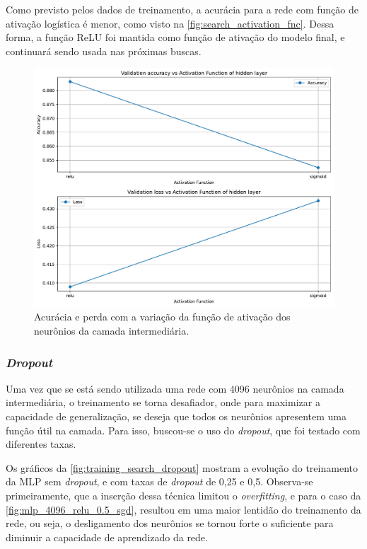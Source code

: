 Como previsto pelos dados de treinamento, a acurácia para a rede com função de ativação logística é menor, como visto na \autoref{fig:search_activation_fnc}. Dessa forma, a função ReLU foi mantida como função de ativação do modelo final, e continuará sendo usada nas próximas buscas.

\begin{figure}[H]
\centering
\includegraphics[width=0.75\linewidth]{../../plot/mlp/search_activation_fnc}
\caption{Acurácia e perda com a variação da função de ativação dos neurônios da camada intermediária.}
\label{fig:search_activation_fnc}
\end{figure}

\subsubsection{\textit{Dropout}}

	Uma vez que se está sendo utilizada uma rede com 4096 neurônios na camada intermediária, o treinamento se torna desafiador, onde para maximizar a capacidade de generalização, se deseja que todos os neurônios apresentem uma função útil na camada. Para isso, buscou-se o uso do \textit{dropout}, que foi testado com diferentes taxas.
	
	Os gráficos da \autoref{fig:training_search_dropout} mostram a evolução do treinamento da MLP sem \textit{dropout}, e com taxas de \textit{dropout} de 0,25 e 0,5. Observa-se primeiramente, que a inserção dessa técnica limitou o \textit{overfitting}, e para o caso da \autoref{fig:mlp_4096_relu_0.5_sgd}, resultou em uma maior lentidão do treinamento da rede, ou seja, o desligamento dos neurônios se tornou forte o suficiente para diminuir a capacidade de aprendizado da rede.
	

